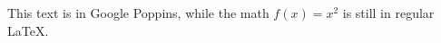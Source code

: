 \documentclass[preview]{standalone}
\begin{document}
\begin{minipage}{5cm}
This text is in Google Poppins, 
            while the math $f(x) = x^2$ is still in regular \LaTeX.
\end{minipage}
\end{document}

